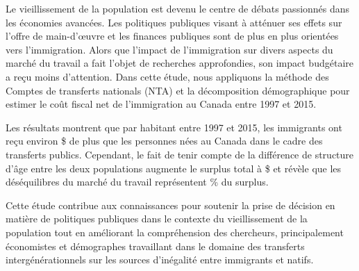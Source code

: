 Le vieillissement de la population est devenu le centre de débats passionnés dans les économies avancées.
Les politiques publiques visant à atténuer ses effets sur l'offre de main-d'œuvre et les finances publiques sont de plus en plus orientées vers l'immigration.
Alors que l'impact de l'immigration sur divers aspects du marché du travail a fait l'objet de recherches approfondies, son impact budgétaire a reçu moins d'attention.
Dans cette étude, nous appliquons la méthode des Comptes de transferts nationals (NTA) et la décomposition démographique pour estimer le coût fiscal net de l'immigration au Canada entre 1997 et 2015.

\vspace{0.7em}\par
Les résultats montrent que par habitant entre 1997 et 2015, les immigrants ont reçu environ \$ de plus que les personnes nées au Canada dans le cadre des transferts publics.
Cependant, le fait de tenir compte de la différence de structure d'âge entre les deux populations augmente le surplus total à \$ et révèle que les déséquilibres du marché du travail représentent \% du surplus.

Cette étude contribue aux connaissances pour soutenir la prise de décision en matière de politiques publiques dans le contexte du vieillissement de la population tout en améliorant la compréhension des chercheurs, principalement économistes et démographes travaillant dans le domaine des transferts intergénérationnels sur les sources d'inégalité entre immigrants et natifs.